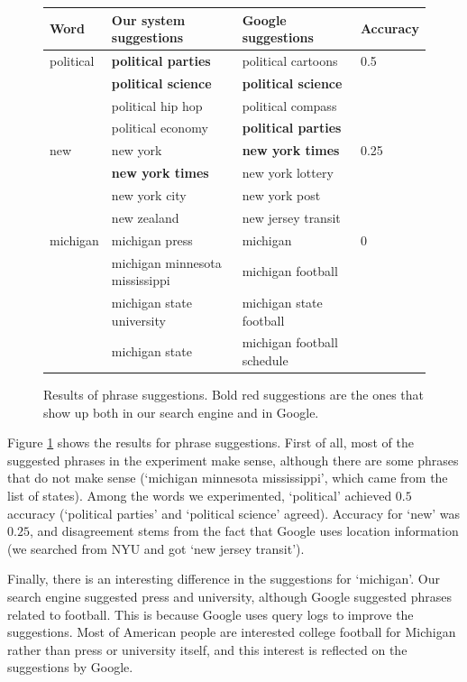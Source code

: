 \documentclass{article}
\begin{document}
\begin{figure}[!h]
\begin{center}
\begin{tabular}{| l | l | l | l |}
\hline
Word & Our system suggestions & Google suggestions & Accuracy \\
\hline
political & {\bf \color{red} political parties} & political cartoons & 0.5 \\
& {\bf \color{red} political science} & {\bf \color{red} political science} & \\
& political hip hop & political compass & \\
& political economy & {\bf \color{red} political parties} & \\
\hline
new & new york & {\bf \color{red} new york times} & 0.25\\
& {\bf \color{red} new york times} & new york lottery & \\
& new york city & new york post & \\
& new zealand & new jersey transit & \\
\hline
michigan & michigan press & michigan  & 0 \\
& michigan minnesota mississippi & michigan football & \\
& michigan state university & michigan state football & \\
& michigan state & michigan football schedule & \\
\hline
\end{tabular}
\end{center}
\caption{Results of phrase suggestions. Bold red suggestions are the ones that show up both in our search engine and in Google.}
\label{fig:phrase}
\end{figure}

Figure \ref{fig:phrase} shows the results for phrase suggestions. First of all, most of the suggested phrases in the experiment make sense, although there are some phrases that do not make sense (`michigan minnesota mississippi', which came from the list of states). Among the words we experimented, `political' achieved $0.5$ accuracy (`political parties' and `political science' agreed). Accuracy for `new' was $0.25$, and disagreement stems from the fact that Google uses location information (we searched from NYU and got `new jersey transit'). 

Finally, there is an interesting difference in the suggestions for `michigan'. Our search engine suggested press and university, although Google suggested phrases related to football. This is because Google uses query logs to improve the suggestions. Most of American people are interested college football for Michigan rather than press or university itself, and this interest is reflected on the suggestions by Google.
\end{document}
